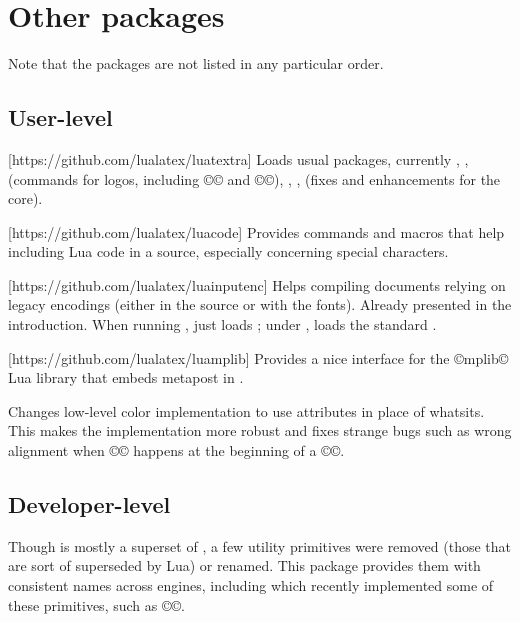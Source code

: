\documentclass{lltxdoc}
\begin{document}
\section{Other packages}\label{other}

Note that the packages are not listed in any particular order.

\subsection{User-level}

[https://github.com/lualatex/luatextra]
Loads usual packages, currently , , 
(commands for logos, including ©\LuaTeX© and ©\LuaLaTeX©), ,
,  (fixes and enhancements for the \latex core).

[https://github.com/lualatex/luacode]
Provides commands and macros that help including Lua code in a \tex source,
especially concerning special characters.

[https://github.com/lualatex/luainputenc]
Helps compiling documents relying on legacy encodings (either in the source or
with the fonts). Already presented in the introduction. When running \xetex,
just loads ; under \pdftex, loads the standard
.

[https://github.com/lualatex/luamplib]
Provides a nice interface for the ©mplib© Lua library that embeds metapost in
\luatex.

Changes low-level color implementation to use \luatex attributes in place of
whatsits. This makes the implementation more robust and fixes strange bugs
such as wrong alignment when ©\color© happens at the beginning of a ©\vbox©.

\subsection{Developer-level}

Though \luatex is mostly a superset of \pdftex, a few utility primitives were
removed (those that are sort of superseded by Lua) or renamed. This package
provides them with consistent names across engines, including \xetex which
recently implemented some of these primitives, such as ©\strcmp©.
\end{document}
